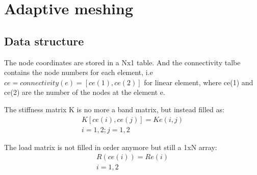 \documentclass[a4paper, 12pt]{article} %
\begin{document}
\section{Adaptive meshing}

\subsection{Data structure}
The node coordinates are stored in a Nx1 table. And the connectivity talbe contains the node numbers for each element, i.e $ce = connectivity(e) = [ce(1), ce(2)]$ for linear element, where ce(1) and ce(2) are the number of the nodes at the element e.

The stiffness matrix K is no more a band matrix, but instead filled as:
\begin{align}
K[ce(i), ce(j)] = Ke(i, j) \nonumber\\
i = 1,2 ; j = 1, 2
\end{align}

The load matrix is not filled in order anymore but still a 1xN array:
\begin{align}
R(ce(i)) = Re(i)\nonumber\\
i =1, 2
\end{align}
\end{document}
